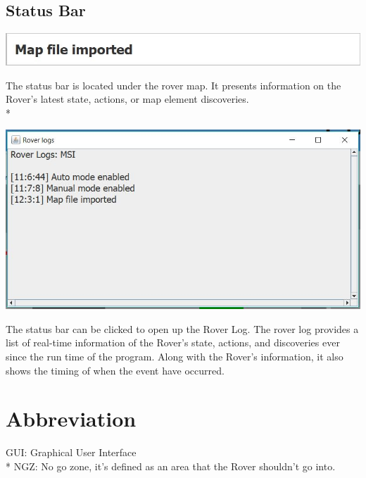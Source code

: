 \documentclass[12pt]{article}
\begin{document}
	\subsection{Status Bar}
		\begin{center}
		\includegraphics[scale=1]{StatusBar.jpg}
		\end{center}
The status bar is located under the rover map. It  presents information on the Rover’s latest state, actions, or map element discoveries.
\\*
		\begin{center}
		\includegraphics[scale=1]{RoverLog.jpg}
		\end{center}
The status bar can be clicked to open up the Rover Log. The rover log provides a list of real-time information of  the Rover’s state, actions, and discoveries ever since the run time of the program. Along with the Rover’s information, it also shows the timing of when the event have occurred. 
		
	
	\section{Abbreviation}
GUI: Graphical User Interface
\\*
NGZ: No go zone, it’s defined as an area that the Rover shouldn’t go into.
		
\end{document}
